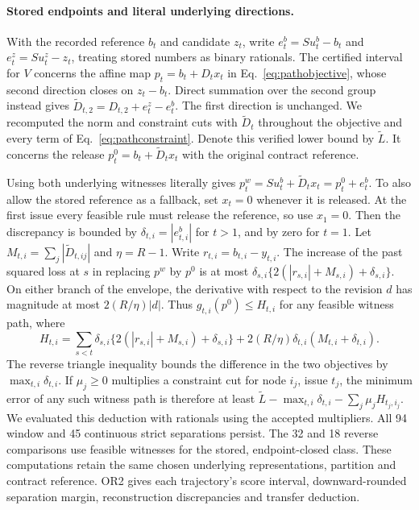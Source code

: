 \paragraph{Stored endpoints and literal underlying directions.}
With the recorded reference $b_t$ and candidate $z_t$, write $e^b_t=Su_t^b-b_t$ and $e^z_t=Su_t^z-z_t$, treating stored numbers as binary rationals. The certified interval for $V$ concerns the affine map $p_t=b_t+D_tx_t$ in Eq.~\eqref{eq:pathobjective}, whose second direction closes on $z_t-b_t$. Direct summation over the second group instead gives $\widetilde D_{t,2}=D_{t,2}+e^z_t-e^b_t$. The first direction is unchanged. We recomputed the norm and constraint cuts with $\widetilde D_t$ throughout the objective and every term of Eq.~\eqref{eq:pathconstraint}. Denote this verified lower bound by $\widetilde L$. It concerns the release $p^0_t=b_t+\widetilde D_tx_t$ with the original contract reference.

Using both underlying witnesses literally gives $p^w_t=Su^b_t+\widetilde D_tx_t=p^0_t+e^b_t$. To also allow the stored reference as a fallback, set $x_t=0$ whenever it is released. At the first issue every feasible rule must release the reference, so use $x_1=0$. Then the discrepancy is bounded by $\delta_{t,i}=|e^b_{t,i}|$ for $t>1$, and by zero for $t=1$. Let $M_{t,i}=\sum_j|\widetilde D_{t,ij}|$ and $\eta=R-1$. Write $r_{t,i}=b_{t,i}-y_{t,i}$. The increase of the past squared loss at $s$ in replacing $p^w$ by $p^0$ is at most
$\delta_{s,i}\{2(|r_{s,i}|+M_{s,i})+\delta_{s,i}\}$. On either branch of the envelope, the derivative with respect to the revision $d$ has magnitude at most $2(R/\eta)|d|$. Thus $g_{t,i}(p^0)\le H_{t,i}$ for any feasible witness path, where
\begin{equation}
 H_{t,i}=\sum_{s<t}\delta_{s,i}\{2(|r_{s,i}|+M_{s,i})+\delta_{s,i}\}
  +2(R/\eta)\delta_{t,i}(M_{t,i}+\delta_{t,i}).
 \tag{P4}\label{eq:pathperturb}
\end{equation}
The reverse triangle inequality bounds the difference in the two objectives by $\max_{t,i}\delta_{t,i}$. If $\mu_j\ge0$ multiplies a constraint cut for node $i_j$, issue $t_j$, the minimum error of any such witness path is therefore at least $\widetilde L-\max_{t,i}\delta_{t,i}-\sum_j\mu_j H_{t_j,i_j}$. We evaluated this deduction with rationals using the accepted multipliers. All 94 window and 45 continuous strict separations persist. The 32 and 18 reverse comparisons use feasible witnesses for the stored, endpoint-closed class. These computations retain the same chosen underlying representations, partition and contract reference. OR2 gives each trajectory's score interval, downward-rounded separation margin, reconstruction discrepancies and transfer deduction.

